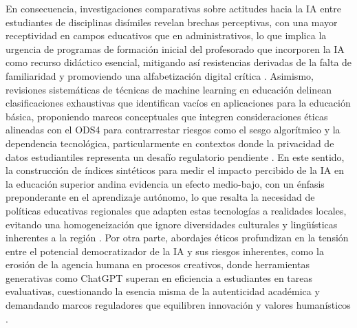 \documentclass[spanish]{textolivre}
\begin{document}
En consecuencia, investigaciones comparativas sobre actitudes hacia la IA entre estudiantes de disciplinas disímiles revelan brechas perceptivas, con una mayor receptividad en campos educativos que en administrativos, lo que implica la urgencia de programas de formación inicial del profesorado que incorporen la IA como recurso didáctico esencial, mitigando así resistencias derivadas de la falta de familiaridad y promoviendo una alfabetización digital crítica \cite{almarazlopez2023, ayusodelpuerto2022}. Asimismo, revisiones sistemáticas de técnicas de machine learning en educación delinean clasificaciones exhaustivas que identifican vacíos en aplicaciones para la educación básica, proponiendo marcos conceptuales que integren consideraciones éticas alineadas con el ODS4 para contrarrestar riesgos como el sesgo algorítmico y la dependencia tecnológica, particularmente en contextos donde la privacidad de datos estudiantiles representa un desafío regulatorio pendiente \cite{forerocorba2024, prendesespinosa2021}. En este sentido, la construcción de índices sintéticos para medir el impacto percibido de la IA en la educación superior andina evidencia un efecto medio-bajo, con un énfasis preponderante en el aprendizaje autónomo, lo que resalta la necesidad de políticas educativas regionales que adapten estas tecnologías a realidades locales, evitando una homogeneización que ignore diversidades culturales y lingüísticas inherentes a la región \cite{grajeda2024}. Por otra parte, abordajes éticos profundizan en la tensión entre el potencial democratizador de la IA y sus riesgos inherentes, como la erosión de la agencia humana en procesos creativos, donde herramientas generativas como ChatGPT superan en eficiencia a estudiantes en tareas evaluativas, cuestionando la esencia misma de la autenticidad académica y demandando marcos reguladores que equilibren innovación y valores humanísticos \cite{vazquezcano2023, michelvillarreal2023}.
\end{document}
